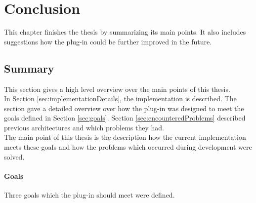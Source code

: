 
\chapter{Conclusion}
\label{chap:conclusion}

This chapter finishes the thesis by summarizing its main points. It also includes suggestions how the plug-in could be further improved in the future.

\section{Summary}
\label{sec:summary}

This section gives a high level overview over the main points of this thesis. \\
In Section \ref{sec:implementationDetails}, the implementation is described. The section gave a detailed overview over how the plug-in was designed to meet the goals defined in Section \ref{sec:goals}. Section \ref{sec:encounteredProblems} described previous architectures and which problems they had.\\
The main point of this thesis is the description how the current implementation meets these goals and how the problems which occurred during development were solved.

\subsubsection{Goals}

Three goals which the plug-in should meet were defined.

